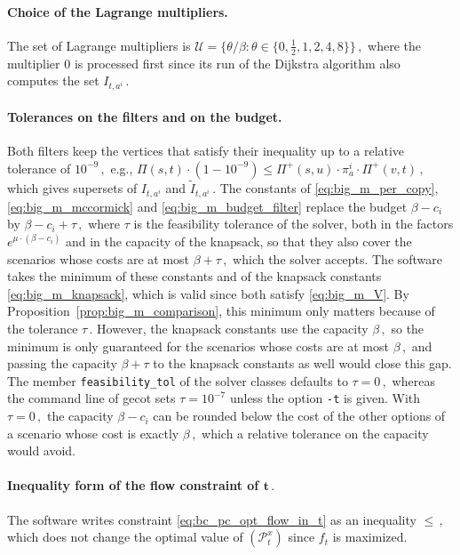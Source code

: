 \documentclass[11pt,a4paper]{report}
\theoremstyle{definition}
\theoremstyle{remark}
\begin{document}
\noindent
\paragraph{Choice of the Lagrange multipliers.}
The set of Lagrange multipliers is $\mathcal{U} = \{\theta / \beta : \theta \in \{0, \frac{1}{2}, 1, 2, 4, 8\}\}\,,$ where the multiplier $0$ is processed first since its run of the Dijkstra algorithm also computes the set $I_{t,a^i}\,.$

\noindent
\paragraph{Tolerances on the filters and on the budget.}
Both filters keep the vertices that satisfy their inequality up to a relative tolerance of $10^{-9}\,,$ e.g., $\Pi(s,t) \cdot (1 - 10^{-9}) \leq \Pi^+(s,u) \cdot \pi^i_a \cdot \Pi^+(v,t)\,,$ which gives supersets of $I_{t,a^i}$ and $\tilde{I}_{t,a^i}\,.$ The constants of \eqref{eq:big_m_per_copy}, \eqref{eq:big_m_mccormick} and \eqref{eq:big_m_budget_filter} replace the budget $\beta - c_i$ by $\beta - c_i + \tau\,,$ where $\tau$ is the feasibility tolerance of the solver, both in the factors $e^{\mu \cdot (\beta - c_i)}$ and in the capacity of the knapsack, so that they also cover the scenarios whose costs are at most $\beta + \tau\,,$ which the solver accepts. The software takes the minimum of these constants and of the knapsack constants \eqref{eq:big_m_knapsack}, which is valid since both satisfy \eqref{eq:big_m_V}. By Proposition~\ref{prop:big_m_comparison}, this minimum only matters because of the tolerance $\tau\,.$ However, the knapsack constants use the capacity $\beta\,,$ so the minimum is only guaranteed for the scenarios whose costs are at most $\beta\,,$ and passing the capacity $\beta + \tau$ to the knapsack constants as well would close this gap. The member \texttt{feasibility\_tol} of the solver classes defaults to $\tau = 0\,,$ whereas the command line of gecot sets $\tau = 10^{-7}$ unless the option \texttt{-t} is given. With $\tau = 0\,,$ the capacity $\beta - c_i$ can be rounded below the cost of the other options of a scenario whose cost is exactly $\beta\,,$ which a relative tolerance on the capacity would avoid.

\noindent
\paragraph{Inequality form of the flow constraint of $\mathbf{t}\,.$}
The software writes constraint \eqref{eq:bc_pc_opt_flow_in_t} as an inequality $\leq\,,$ which does not change the optimal value of $(\mathcal{P}^x_t)$ since $f_t$ is maximized.
\end{document}
